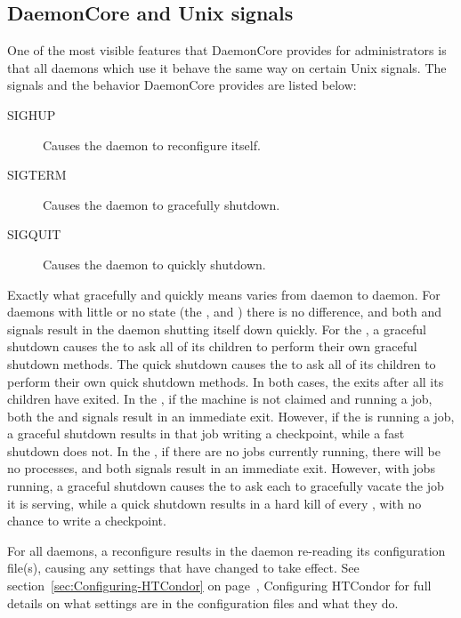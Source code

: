 \subsection{\label{sec:DaemonCore-Signals}DaemonCore and Unix signals}

One of the most visible features that DaemonCore provides for
administrators is that all daemons which use it behave the same way on
certain Unix signals.  The signals and the behavior DaemonCore
provides are listed below:

\begin{description}
\item[SIGHUP] Causes the daemon to reconfigure itself.
\item[SIGTERM] Causes the daemon to gracefully shutdown.
\item[SIGQUIT] Causes the daemon to quickly shutdown.
\end{description}

Exactly what gracefully and quickly means varies from daemon
to daemon.  For daemons with little or no state 
(the ,  and )
there is no difference, and both  and  signals
result in the daemon shutting itself down quickly.
For the ,
a graceful shutdown causes the  to ask all of 
its children to perform their own graceful shutdown methods.
The quick shutdown causes the  to ask all of 
its children to perform their own quick shutdown methods.
In both cases, the  exits after all its children have exited.
In the , if the machine is not claimed and running a job, 
both the  and  signals result in an immediate exit.
However, if the  is running a job,
a graceful shutdown results in that job writing a checkpoint,
while a fast shutdown does not.
In the , if there are no jobs currently running,
there will be no  processes,
and both signals result in an immediate exit.
However, with jobs running, a graceful shutdown causes
the  to ask each  to gracefully vacate
the job it is serving, 
while a quick shutdown results in a hard kill of every ,
with no chance to write a checkpoint.  

For all daemons, a reconfigure results in the daemon re-reading
its configuration file(s), causing any settings that have changed
to take effect.
See section~\ref{sec:Configuring-HTCondor} on
page~\pageref{sec:Configuring-HTCondor}, Configuring HTCondor for full
details on what settings are in the configuration files and what they do.

